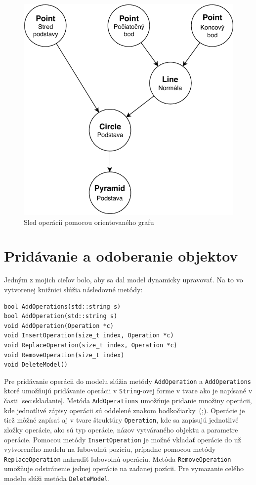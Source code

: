 \begin{figure}[H]
	\centering
	\includegraphics[height=0.6\textwidth]{obrazky-figures/DP Navrh operacii-Strom.pdf}
	\caption{Sled operácií pomocou orientovaného grafu}
	\label{fig:Sled_operácii_pomocou_orientovaného_grafu}
\end{figure}



















\section{Pridávanie a odoberanie objektov}
\label{sec:addAndRemoveObjects}
Jedným z mojich cieľov bolo, aby sa dal model dynamicky upravovať. Na to vo vytvorenej knižnici slúžia následovné metódy:
\lstset {language=C++}
\begin{lstlisting}
bool AddOperations(std::string s)
bool AddOperation(std::string s)
void AddOperation(Operation *c) 
void InsertOperation(size_t index, Operation *c)
void ReplaceOperation(size_t index, Operation *c)
void RemoveOperation(size_t index)
void DeleteModel()
\end{lstlisting}
Pre pridávanie operácii do modelu slúžia metódy \texttt{AddOperation}  a \texttt{AddOperations} ktoré umožňujú pridávanie operácii v \texttt{String}-ovej forme v tvare ako je napísané v časti \ref{sec:skladanie}. Metóda \texttt{AddOperations} umožňuje pridanie množiny operácii, kde jednotlivé zápisy operácii sú oddelené znakom bodkočiarky~(;).  Operácie je tiež môžné zapísať aj v tvare štruktúry \texttt{Operation}, kde sa zapisujú jednotlivé zložky operácie, ako sú typ operácie, názov vytváraného objektu a parametre operácie.
Pomocou metódy \texttt{InsertOperation} je možné vkladať operácie do už vytvoreného modelu na ľubovolnú pozíciu, prípadne pomocou metódy \texttt{ReplaceOperation} nahradiť ľubovolnú operáciu. 
Metóda \texttt{RemoveOperation} umožňuje odstránenie jednej operácie na zadanej pozícii. Pre vymazanie celého modelu slúži metóda \texttt{DeleteModel}. 


